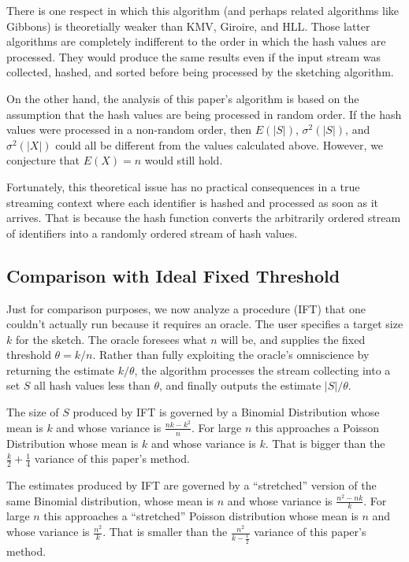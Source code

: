 \documentclass{sig-alternate}
\begin{document}
There is one respect in which this algorithm (and perhaps related algorithms like Gibbons) is theoretially
weaker than KMV, Giroire, and HLL. Those latter algorithms are completely indifferent to the order in which the hash
values are processed. They would produce the same results even if the input stream was collected, hashed,
and sorted before being processed by the sketching algorithm.

On the other hand, the analysis of this paper's algorithm is based on the assumption that the hash values
are being processed in random order. If the hash values were processed in a non-random order, then $E(|S|)$, 
$\sigma^2(|S|)$, and $\sigma^2(|X|)$ could all be different from the values calculated above. However,
we conjecture that $E(X) = n$ would still hold.

Fortunately, this theoretical issue has no practical consequences in a true streaming context where each
identifier is hashed and processed as soon as it arrives. That is because the hash function 
converts the arbitrarily ordered stream of identifiers into a randomly ordered stream of hash values.

\subsection{Comparison with Ideal Fixed Threshold}

Just for comparison purposes, we now analyze a procedure (IFT) that one couldn't actually run because it requires
an oracle. The user specifies a target size $k$ for the sketch. The oracle foresees what $n$ 
will be, and supplies the fixed threshold $\theta = k / n$. Rather than fully exploiting the oracle's
omniscience by returning the estimate $k / \theta$, the algorithm processes the stream collecting into a set $S$
all hash values less than $\theta$, and finally outputs the estimate $|S|/\theta$.

The size of $S$ produced by IFT is governed by a 
Binomial Distribution whose mean is $k$ and whose variance is
$\frac{nk-k^2}{n}$.  For large $n$ this approaches a Poisson
Distribution whose mean is $k$ and whose variance is $k$.
That is bigger than the $\frac{k}{2} + \frac{1}{4}$ variance of this paper's method.

The estimates produced by IFT are governed by a ``stretched'' version of the same Binomial distribution, whose mean is $n$ 
and whose variance is $\frac{n^2-nk}{k}$.  For large $n$ this approaches a ``stretched'' Poisson
distribution whose mean is $n$ and whose variance is $\frac{n^2}{k}$. 
That is smaller than the $\frac{n^2}{k-\frac{1}{2}}$ variance of this paper's method.
\end{document}
